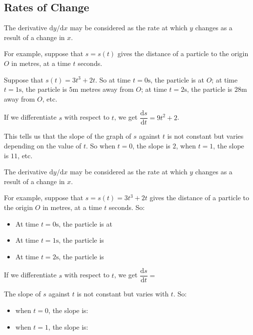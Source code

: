 \documentclass[
  english,
  11pt,
  oneside]{book}
\providecommand{\tightlist}{%
  \setlength{\itemsep}{0pt}\setlength{\parskip}{0pt}}
\newcommand{\slide}{}
\theoremstyle{definition}
\theoremstyle{definition}
\theoremstyle{definition}
\theoremstyle{definition}
\theoremstyle{remark}
\begin{document}
\slide

\subsection{Rates of Change}\label{rates-of-change}

\begin{notslides}

The derivative \(\mathrm{d}y/\mathrm{d} x\) may be considered as the rate at which \(y\) changes as a result of a change in \(x\).

For example, suppose that \(s=s(t)\) gives the distance of a particle to the origin \(O\) in metres, at a time \(t\) seconds.

Suppose that \(s(t) = 3t^3 + 2t\). So at time \(t = 0\text{s}\), the particle is at \(O\); at time \(t = 1\text{s}\), the particle is \(5\text{m}\) metres away from \(O\); at time \(t = 2\text{s}\), the particle is \(28\text{m}\) away from \(O\), etc.

If we differentiate \(s\) with respect to \(t\), we get \(\dfrac{\mathrm{d} s}{\mathrm{d} t} = 9t^2 + 2\).

This tells us that the slope of the graph of \(s\) against \(t\) is not constant but varies depending on the value of \(t\). So when \(t = 0\), the slope is \(2\), when \(t = 1\), the slope is \(11\), etc.

\end{notslides}

\begin{slidesonly}

The derivative \(\mathrm{d}y/\mathrm{d} x\) may be considered as the rate at which \(y\) changes as a result of a change in \(x\).

For example, suppose that \(s=s(t)=3t^3 + 2t\) gives the distance of a particle to the origin \(O\) in metres, at a time \(t\) seconds. So:

\begin{itemize}
\tightlist
\item
  At time \(t = 0\text{s}\), the particle is at
\item
  At time \(t = 1\text{s}\), the particle is
\item
  At time \(t = 2\text{s}\), the particle is
\end{itemize}

If we differentiate \(s\) with respect to \(t\), we get \(\dfrac{\mathrm{d} s}{\mathrm{d} t} =\)

The slope of \(s\) against \(t\) is not constant but varies with \(t\). So:

\begin{itemize}
\tightlist
\item
  when \(t = 0\), the slope is:
\item
  when \(t = 1\), the slope is:
\end{itemize}

\end{slidesonly}
\end{document}
